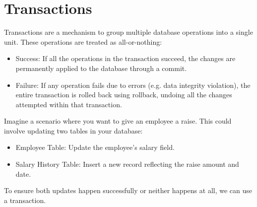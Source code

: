 \section{Transactions}


Transactions are a mechanism to group multiple database operations into a single unit. These operations are treated as all-or-nothing:

\begin{itemize}
\item Success: If all the operations in the transaction succeed, the changes are permanently applied to the database through a commit.
\item Failure: If any operation fails due to errors (e.g. data integrity violation), the entire transaction is rolled back using rollback, undoing all the changes attempted within that transaction.
\end{itemize}

Imagine a scenario where you want to give an employee a raise. This could involve updating two tables in your database:
\begin{itemize}
\item Employee Table: Update the employee's salary field.
\item Salary History Table: Insert a new record reflecting the raise amount and date.
\end{itemize}

To ensure both updates happen successfully or neither happens at all, we can use a transaction.

